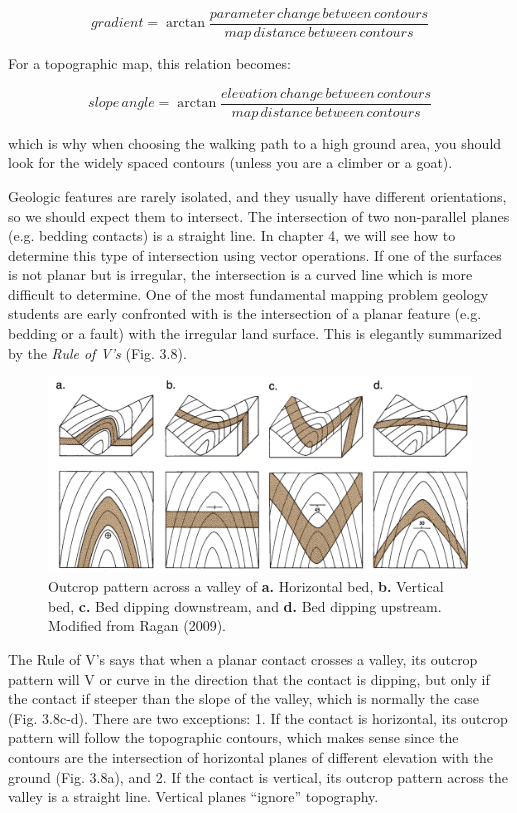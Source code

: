 \documentclass[a4paper , 12pt]{book}
\begin{document}
\begin{equation}
    gradient = \arctan\frac{parameter\,change\,between\,contours}{map\,distance\,between\,contours} \tag{3.5a}
\end{equation}

For a topographic map, this relation becomes:

\begin{equation}
    slope\,angle = \arctan\frac{elevation\,change\,between\,contours}{map\,distance\,between\,contours} \tag{3.5b}
\end{equation}

which is why when choosing the walking path to a high ground area, you should look for the widely spaced contours (unless you are a climber or a goat).

Geologic features are rarely isolated, and they usually have different orientations, so we should expect them to intersect. The intersection of two non-parallel planes (e.g. bedding contacts) is a straight line. In chapter 4, we will see how to determine this type of intersection using vector operations. If one of the surfaces is not planar but is irregular, the intersection is a curved line which is more difficult to determine. One of the most fundamental mapping problem geology students are early confronted with is the intersection of a planar feature (e.g. bedding or a fault) with the irregular land surface. This is elegantly summarized by the \textit{Rule of V’s} (Fig. 3.8).

\begin{figure}[ht]
    \centering
    \includegraphics[width=13cm]{Figures/ch3f8.png}
    \caption{Outcrop pattern across a valley of \textbf{a.} Horizontal bed, \textbf{b.} Vertical bed, \textbf{c.} Bed dipping downstream, and \textbf{d.} Bed dipping upstream. Modified from Ragan (2009).}
\end{figure}

The Rule of V’s says that when a planar contact crosses a valley, its outcrop pattern will V or curve in the direction that the contact is dipping, but only if the contact if steeper than the slope of the valley, which is normally the case (Fig. 3.8c-d). There are two exceptions: 1. If the contact is horizontal, its outcrop pattern will follow the topographic contours, which makes sense since the contours are the intersection of horizontal planes of different elevation with the ground (Fig. 3.8a), and 2. If the contact is vertical, its outcrop pattern across the valley is a straight line. Vertical planes “ignore” topography.
\end{document}

